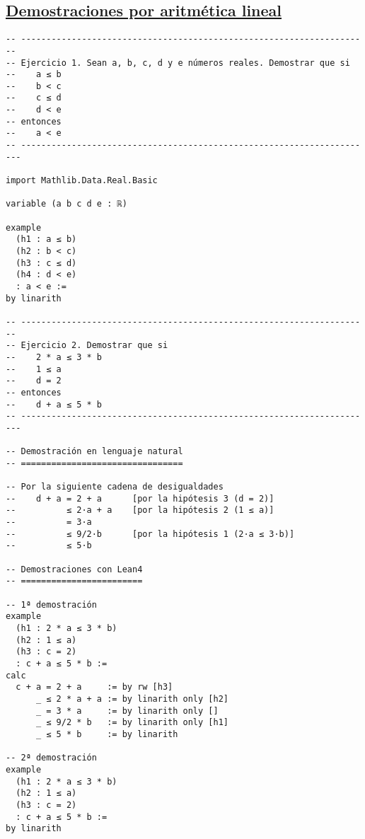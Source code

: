 \subsection{\href{./src/Basicos/Demostraciones\_por\_aritmetica\_lineal.lean}{Demostraciones por aritmética lineal}}
\label{sec:orgda3bd94}
\begin{verbatim}
-- ---------------------------------------------------------------------
-- Ejercicio 1. Sean a, b, c, d y e números reales. Demostrar que si
--    a ≤ b
--    b < c
--    c ≤ d
--    d < e
-- entonces
--    a < e
-- ----------------------------------------------------------------------

import Mathlib.Data.Real.Basic

variable (a b c d e : ℝ)

example
  (h1 : a ≤ b)
  (h2 : b < c)
  (h3 : c ≤ d)
  (h4 : d < e)
  : a < e :=
by linarith

-- ---------------------------------------------------------------------
-- Ejercicio 2. Demostrar que si
--    2 * a ≤ 3 * b
--    1 ≤ a
--    d = 2
-- entonces
--    d + a ≤ 5 * b
-- ----------------------------------------------------------------------

-- Demostración en lenguaje natural
-- ================================

-- Por la siguiente cadena de desigualdades
--    d + a = 2 + a      [por la hipótesis 3 (d = 2)]
--          ≤ 2·a + a    [por la hipótesis 2 (1 ≤ a)]
--          = 3·a
--          ≤ 9/2·b      [por la hipótesis 1 (2·a ≤ 3·b)]
--          ≤ 5·b

-- Demostraciones con Lean4
-- ========================

-- 1ª demostración
example
  (h1 : 2 * a ≤ 3 * b)
  (h2 : 1 ≤ a)
  (h3 : c = 2)
  : c + a ≤ 5 * b :=
calc
  c + a = 2 + a     := by rw [h3]
      _ ≤ 2 * a + a := by linarith only [h2]
      _ = 3 * a     := by linarith only []
      _ ≤ 9/2 * b   := by linarith only [h1]
      _ ≤ 5 * b     := by linarith

-- 2ª demostración
example
  (h1 : 2 * a ≤ 3 * b)
  (h2 : 1 ≤ a)
  (h3 : c = 2)
  : c + a ≤ 5 * b :=
by linarith
\end{verbatim}

